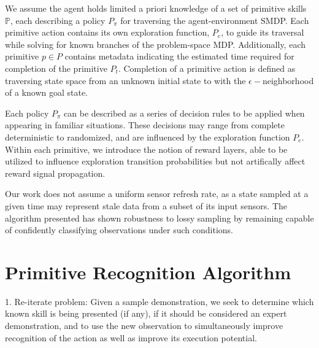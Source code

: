 \documentclass[letterpaper]{article}
\begin{document}
We assume the agent holds limited a priori knowledge of a set of primitive skills $\mathbb{P}$, each describing a policy $P_\pi$ for traversing the agent-environment SMDP. Each primitive action contains its own exploration function, $P_e$, to guide its traversal while solving for known branches of the problem-space MDP. Additionally, each primitive $p \in P$ contains metadata indicating the estimated time required for completion of the primitive $P_t$. Completion of a primitive action is defined as traversing state space from an unknown initial state to with the $\epsilon-$neighborhood of a known goal state.

Each policy $P_\pi$ can be described as a series of decision rules to be applied when appearing in familiar situations. These decisions may range from complete deterministic to randomized, and are influenced by the exploration function $P_e$. Within each primitive, we introduce the notion of reward layers, able to be utilized to influence exploration transition probabilities but not artifically affect reward signal propagation.

Our work does not assume a uniform sensor refresh rate, as a state sampled at a given time may represent stale data from a subset of its input sensors. The algorithm presented has shown robustness to lossy sampling by remaining capable of confidently classifying observations under such conditions.








\section{Primitive Recognition Algorithm}
\label{sec:recognition}
1. Re-iterate problem: Given a sample demonstration, we seek to determine which known skill is being presented (if any),
                       if it should be considered an expert demonstration, and to use the new observation to simultaneously
                       improve recognition of the action as well as improve its execution potential.
\end{document}
